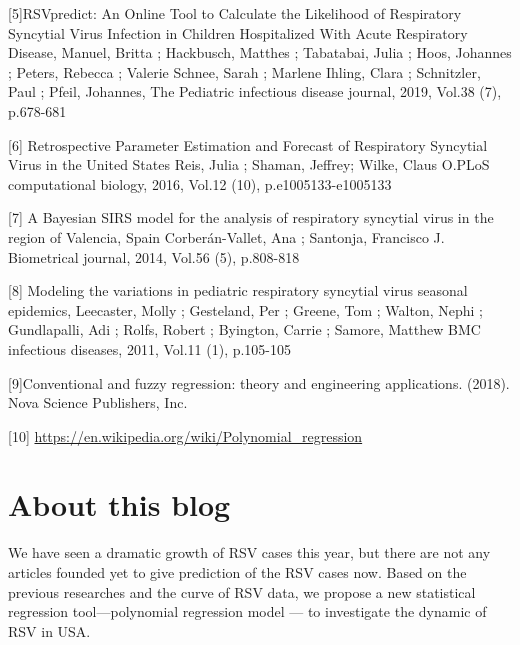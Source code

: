 \documentclass[
  letterpaper,
  DIV=11,
  numbers=noendperiod]{scrreport}
\begin{document}
{[}5{]}RSVpredict: An Online Tool to Calculate the Likelihood of
Respiratory Syncytial Virus Infection in Children Hospitalized With
Acute Respiratory Disease, Manuel, Britta ; Hackbusch, Matthes ;
Tabatabai, Julia ; Hoos, Johannes ; Peters, Rebecca ; Valerie Schnee,
Sarah ; Marlene Ihling, Clara ; Schnitzler, Paul ; Pfeil, Johannes, The
Pediatric infectious disease journal, 2019, Vol.38 (7), p.678-681

{[}6{]} Retrospective Parameter Estimation and Forecast of Respiratory
Syncytial Virus in the United States Reis, Julia ; Shaman, Jeffrey;
Wilke, Claus O.PLoS computational biology, 2016, Vol.12 (10),
p.e1005133-e1005133

{[}7{]} A Bayesian SIRS model for the analysis of respiratory syncytial
virus in the region of Valencia, Spain Corberán-Vallet, Ana ; Santonja,
Francisco J. Biometrical journal, 2014, Vol.56 (5), p.808-818

{[}8{]} Modeling the variations in pediatric respiratory syncytial virus
seasonal epidemics, Leecaster, Molly ; Gesteland, Per ; Greene, Tom ;
Walton, Nephi ; Gundlapalli, Adi ; Rolfs, Robert ; Byington, Carrie ;
Samore, Matthew BMC infectious diseases, 2011, Vol.11 (1), p.105-105

{[}9{]}Conventional and fuzzy regression: theory and engineering
applications. (2018). Nova Science Publishers, Inc.

{[}10{]} \url{https://en.wikipedia.org/wiki/Polynomial_regression}


\hypertarget{about-this-blog}{%
\chapter{About this blog}\label{about-this-blog}}

We have seen a dramatic growth of RSV cases this year, but there are not
any articles founded yet to give prediction of the RSV cases now. Based
on the previous researches and the curve of RSV data, we propose a new
statistical regression tool---polynomial regression model --- to
investigate the dynamic of RSV in USA.
\end{document}
